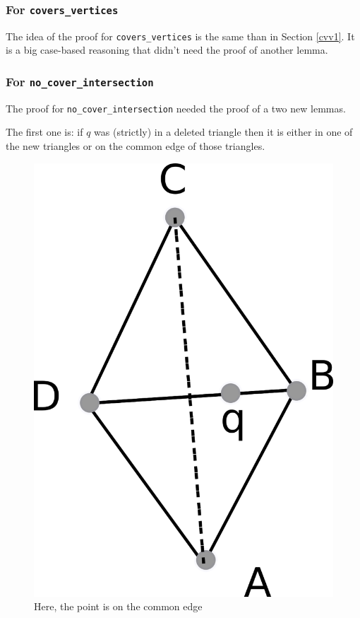 \documentclass[a4paper,10pt]{article}
\begin{document}
\subsubsection{For {\tt covers\_vertices}}

The idea of the proof for {\tt covers\_vertices} is the same than in Section \ref{cvv1}. It is a big case-based reasoning that didn't need the proof of another lemma.

\subsubsection{For {\tt no\_cover\_intersection}}

The proof for {\tt no\_cover\_intersection} needed the proof of a two new lemmas.

The first one is: if $q$ was (strictly) in a deleted triangle then it is either in one of the new triangles or on the common edge of those triangles.
\begin{figure}
  \centering
  \includegraphics[scale=2]{flip_edge_nci}
    \caption{Here, the point is on the common edge}
\end{figure}
\end{document}
